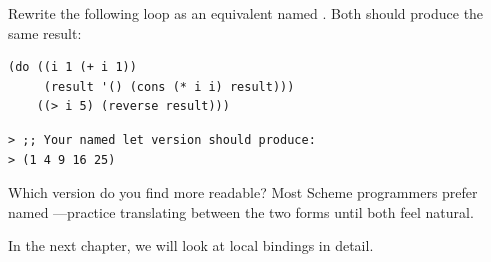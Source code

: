 \begin{exercise}
Rewrite the following  loop as an equivalent named . Both should produce the same result:

\begin{lstlisting}
(do ((i 1 (+ i 1))
     (result '() (cons (* i i) result)))
    ((> i 5) (reverse result)))
\end{lstlisting}

\begin{lstlisting}[style=repl]
> ;; Your named let version should produce:
> (1 4 9 16 25)
\end{lstlisting}

Which version do you find more readable? Most Scheme programmers prefer named ---practice translating between the two forms until both feel natural.
\end{exercise}

In the next chapter, we will look at local bindings in detail.

\chapterend
